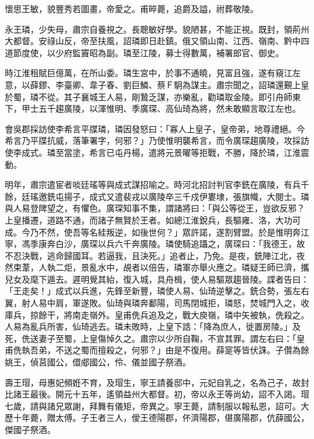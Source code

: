 \begin{pinyinscope}
 懷思王敏，貌豐秀若圖畫，帝愛之。甫晬薨，追爵及謚，祔葬敬陵。



 永王璘，少失母，肅宗自養視之。長聰敏好學。貌陋甚，不能正視。既封，領荊州大都督。安祿山反，帝至扶風，詔璘即日赴鎮。俄又領山南、江西、嶺南、黔中四道節度使，以少府監竇昭為副。璘至江陵，募士得數萬，補署郎官、御史。



 時江淮租賦巨億萬，在所山委。璘生宮中，於事不通曉，見富且強，遂有窺江左意，以薛鏐、李臺卿、韋子春、劉巨鱗、蔡Ｆ駉為謀主。肅宗聞之，詔璘還覲上皇於蜀，璘不從。其子襄城王人易，剛鷙乏謀，亦樂亂，勸璘取金陵。即引舟師東下，甲士五千趨廣陵，以渾惟明、季廣琛、高仙琦為將，然未敢顯言取江左也。



 會吳郡採訪使李希言平牒璘，璘因發怒曰：「寡人上皇子，皇帝弟，地尊禮絕。今希言乃平牒抗威，落筆署字，何邪？」乃使惟明襲希言，而令廣琛趨廣陵，攻採訪使李成式。璘至當塗，希言已屯丹楊，遣將元景曜等拒戰，不勝，降於璘，江淮震動。



 明年，肅宗遣宦者啖廷瑤等與成式謀招喻之。時河北招討判官李銑在廣陵，有兵千餘，廷瑤邀銑屯揚子，成式又遣裴戎以廣陵卒三千戍伊婁埭，張旗幟，大閱士。璘與人易登陴望之，有懼色。廣琛知事不集，謂諸將曰：「與公等從王，豈欲反邪？上皇播遷，道路不通，而諸子無賢於王者。如總江淮銳兵，長驅雍、洛，大功可成。今乃不然，使吾等名絓叛逆，如後世何？」眾許諾，遂割臂盟。於是惟明奔江寧，馮季康奔白沙，廣琛以兵六千奔廣陵。璘使騎追躡之，廣琛曰：「我德王，故不忍決戰，逃命歸國耳。若逼我，且決死。」追者止，乃免。是夜，銑陣江北，夜然束葦，人執二炬，景亂水中，覘者以倍告，璘軍亦舉火應之。璘疑王師已濟，攜兒女及麾下遁去。遲明覺其紿，復入城，具舟楫，使人易驅眾趨晉陵。諜者告曰：「王走矣！」成式以兵進，先鋒至新豐，璘使人易、仙琦逆擊之。銑合勢，張左右翼，射人易中肩，軍遂敗。仙琦與璘奔鄱陽，司馬閉城拒，璘怒，焚城門入之，收庫兵，掠餘干，將南走嶺外。皇甫侁兵追及之，戰大庾嶺，璘中矢被執，侁殺之。人易為亂兵所害，仙琦逃去。璘未敗時，上皇下誥：「降為庶人，徙置房陵。」及死，侁送妻子至蜀，上皇傷悼久之。肅宗以少所自鞠，不宣其罪。謂左右曰：「皇甫侁執吾弟，不送之蜀而擅殺之，何邪？」由是不復用。薛寔等皆伏誅。子儹為餘姚王，偵莒國公，儇郕國公，伶、儀並國子祭酒。



 壽王瑁，母惠妃頻姙不育，及瑁生，寧王請養邸中，元妃自乳之，名為己子，故封比諸王最後。開元十五年，遙領益州大都督。初，帝以永王等尚幼，詔不入謁。瑁七歲，請與諸兄眾謝，拜舞有儀矩，帝異之。寧王薨，請制服以報私恩，詔可。大歷十年薨，贈太傅。子王者三人，僾王德陽郡，伓濟陽郡，偡廣陽郡，伉薛國公，傑國子祭酒。




\end{pinyinscope}
